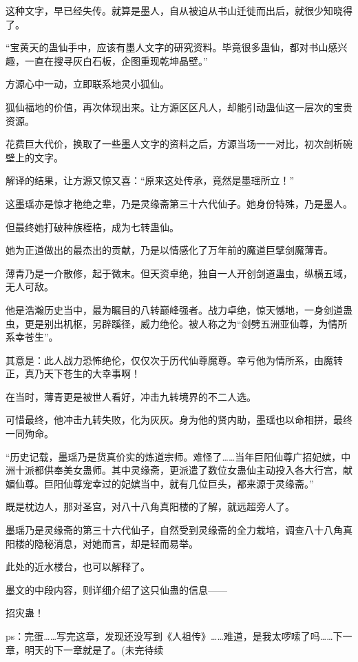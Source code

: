 \begin{this_body}
这种文字，早已经失传。就算是墨人，自从被迫从书山迁徙而出后，就很少知晓得了。

“宝黄天的蛊仙手中，应该有墨人文字的研究资料。毕竟很多蛊仙，都对书山感兴趣，一直在搜寻灰白石板，企图重现乾坤晶壁。”

方源心中一动，立即联系地灵小狐仙。

狐仙福地的价值，再次体现出来。让方源区区凡人，却能引动蛊仙这一层次的宝贵资源。

花费巨大代价，换取了一些墨人文字的资料之后，方源当场一一对比，初次剖析碗壁上的文字。

解译的结果，让方源又惊又喜：“原来这处传承，竟然是墨瑶所立！”

这墨瑶亦是惊才艳绝之辈，乃是灵缘斋第三十六代仙子。她身份特殊，乃是墨人。

但最终她打破种族桎梏，成为七转蛊仙。

她为正道做出的最杰出的贡献，乃是以情感化了万年前的魔道巨擘剑魔薄青。

薄青乃是一介散修，起于微末。但天资卓绝，独自一人开创剑道蛊虫，纵横五域，无人可敌。

他是浩瀚历史当中，最为瞩目的八转巅峰强者。战力卓绝，惊天憾地，一身剑道蛊虫，更是别出机枢，另辟蹊径，威力绝伦。被人称之为“剑劈五洲亚仙尊，为情所系幸苍生”。

其意是：此人战力恐怖绝伦，仅仅次于历代仙尊魔尊。幸亏他为情所系，由魔转正，真乃天下苍生的大幸事啊！

在当时，薄青更是被世人看好，冲击九转境界的不二人选。

可惜最终，他冲击九转失败，化为灰灰。身为他的贤内助，墨瑶也以命相拼，最终一同殉命。

“历史记载，墨瑶乃是货真价实的炼道宗师。难怪了……当年巨阳仙尊广招妃嫔，中洲十派都供奉美女蛊师。其中灵缘斋，更派遣了数位女蛊仙主动投入各大行宫，献媚仙尊。巨阳仙尊宠幸过的妃嫔当中，就有几位巨头，都来源于灵缘斋。”

既是枕边人，那对圣宫，对八十八角真阳楼的了解，就远超旁人了。

墨瑶乃是灵缘斋的第三十六代仙子，自然受到灵缘斋的全力栽培，调查八十八角真阳楼的隐秘消息，对她而言，却是轻而易举。

此处的近水楼台，也可以解释了。

墨文的中段内容，则详细介绍了这只仙蛊的信息——

招灾蛊！

ps：完蛋……写完这章，发现还没写到《人祖传》……难道，是我太啰嗦了吗……下一章，明天的下一章就是了。(未完待续

\end{this_body}

